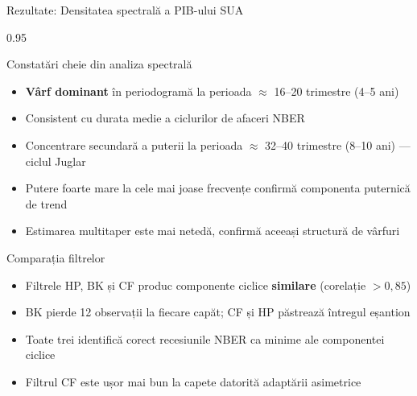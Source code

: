 \documentclass[9pt, aspectratio=169, t]{beamer}
\begin{document}
\begin{frame}{Rezultate: Densitatea spectrală a PIB-ului SUA}
    \begin{cminipage}{0.95\textwidth}
    \vspace{-2mm}
    \begin{block}{Constatări cheie din analiza spectrală}
        {\small
        \begin{itemize}\setlength{\itemsep}{0pt}
            \item \textbf{Vârf dominant} în periodogramă la perioada $\approx$ 16--20 trimestre (4--5 ani)
            \item Consistent cu durata medie a ciclurilor de afaceri NBER
            \item Concentrare secundară a puterii la perioada $\approx$ 32--40 trimestre (8--10 ani) --- ciclul Juglar
            \item Putere foarte mare la cele mai joase frecvențe confirmă componenta puternică de trend
            \item Estimarea multitaper este mai netedă, confirmă aceeași structură de vârfuri
        \end{itemize}
        }
    \end{block}
    \vspace{-2mm}
    \begin{exampleblock}{Comparația filtrelor}
        {\small
        \begin{itemize}\setlength{\itemsep}{0pt}
            \item Filtrele HP, BK și CF produc componente ciclice \textbf{similare} (corelație $> 0{,}85$)
            \item BK pierde 12 observații la fiecare capăt; CF și HP păstrează întregul eșantion
            \item Toate trei identifică corect recesiunile NBER ca minime ale componentei ciclice
            \item Filtrul CF este ușor mai bun la capete datorită adaptării asimetrice
        \end{itemize}
        }
    \end{exampleblock}
    \end{cminipage}
\end{frame}
\end{document}
